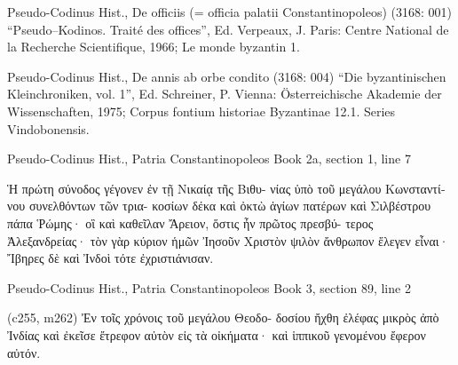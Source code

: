\documentclass[12pt,letterpaper,twoside,final]{memoir}
\begin{document}
\begin{greek}

Pseudo-Codinus Hist., De officiis (= officia palatii Constantinopoleos) (3168: 001)
“Pseudo–Kodinos. Traité des offices”, Ed. Verpeaux, J.
Paris: Centre National de la Recherche Scientifique, 1966; Le monde byzantin 1.



Pseudo-Codinus Hist., De annis ab orbe condito (3168: 004)
“Die byzantinischen Kleinchroniken, vol. 1”, Ed. Schreiner, P.
Vienna: Österreichische Akademie der Wissenschaften, 1975; Corpus fontium historiae Byzantinae 12.1. Series Vindobonensis.



Pseudo-Codinus Hist., Patria Constantinopoleos 
Book 2a, section 1, line 7

        Ἡ πρώτη σύνοδος γέγονεν ἐν τῇ Νικαίᾳ τῆς Βιθυ-
νίας ὑπὸ τοῦ μεγάλου Κωνσταντίνου συνελθόντων τῶν τρια-
κοσίων δέκα καὶ ὀκτὼ ἁγίων πατέρων καὶ Σιλβέστρου πάπα 
Ῥώμης· οἳ καὶ καθεῖλαν Ἄρειον, ὅστις ἦν πρῶτος πρεσβύ-
τερος Ἀλεξανδρείας· τὸν γὰρ κύριον ἡμῶν Ἰησοῦν Χριστὸν 
ψιλὸν ἄνθρωπον ἔλεγεν εἶναι· Ἴβηρες δὲ καὶ Ἰνδοὶ τότε 
ἐχριστιάνισαν. 


Pseudo-Codinus Hist., Patria Constantinopoleos 
Book 3, section 89, line 2

(c255, m262) Ἐν τοῖς χρόνοις τοῦ μεγάλου Θεοδο-
δοσίου ἤχθη ἐλέφας μικρὸς ἀπὸ Ἰνδίας καὶ ἐκεῖσε ἔτρεφον 
αὐτὸν εἰς τὰ οἰκήματα· καὶ ἱππικοῦ γενομένου ἔφερον 
αὐτόν. 


\end{greek}
\end{document}
